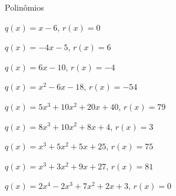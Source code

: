 \begin{exercicios}{Polinômios}
\begin{exercicio}
\begin{answers}
\begin{alphalist}
                \item $q(x) = x - 6$,                      $r(x) = 0$
                \item $q(x) = -4x - 5$,                    $r(x) = 6$
                \item $q(x) = 6x - 10$,                    $r(x) = -4$
                \item $q(x) = x^2 - 6x - 18$,              $r(x) = -54$
                \item $q(x) = 5x^3 + 10x^2 + 20x + 40$,    $r(x) = 79$
                \item $q(x) = 8x^3 + 10x^2 + 8x + 4$,      $r(x) = 3$
                \item $q(x) = x^3 + 5x^2 + 5x + 25$,       $r(x) = 75$
                \item $q(x) = x^3 + 3x^2 + 9x + 27$,       $r(x) = 81$
                \item $q(x) = 2x^4 -2x^3 +7x^2 +2x+3$,     $r(x) = 0$
            \end{alphalist}
        \end{answers}
    \end{exercicio}
    

\end{exercicios}
